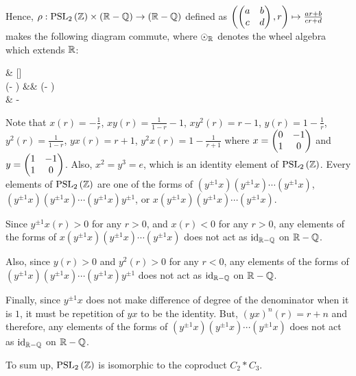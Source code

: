 {    Hence, $\rho : \mathrm{PSL}_{2}\left(\mathbb{Z}\right) \times \left(\mathbb{R} - \mathbb{Q}\right) \to \left(\mathbb{R} - \mathbb{Q}\right)$ defined as $\left( \begin{pmatrix}a & b \\ c & d\end{pmatrix}, r \right) \mapsto \frac{ar+b}{cr+d}$ makes the following diagram commute, where $\odot_{\mathbb{R}}$ denotes the wheel algebra which extends $\mathbb{R}$:
    \begin{cd}[row sep=4em]
        \& [\widthof{$\left(\RR - \QQ\right)$}]  \ar[dr, "m_G \times \id{\RR}"] \\
         \times \left(\RR - \QQ\right)  \&\&  \times \left(\RR - \QQ\right) \ar[dl, "\rho"] \\
        \& \RR - \QQ
    \end{cd}

    Note that $x(r) = -\frac{1}{r}$, $xy(r) = \frac{1}{1-r}-1$, $xy^2(r) = r-1$, $y(r) = 1-\frac{1}{r}$, $y^2(r) = \frac{1}{1-r}$, $yx(r) = r+1$, $y^2x(r) = 1-\frac{1}{r+1}$ where $x = \begin{pmatrix}0 & -1 \\ 1 & 0\end{pmatrix}$ and $y = \begin{pmatrix}1 & -1 \\ 1 & 0\end{pmatrix}$.
    Also, $x^2 = y^3 = e$, which is an identity element of $\mathrm{PSL}_{2}\left(\mathbb{Z}\right)$.
    Every elements of $\mathrm{PSL}_{2}\left(\mathbb{Z}\right)$ are one of the forms of $\left(y^{\pm1}x\right)\left(y^{\pm1}x\right)\cdots\left(y^{\pm1}x\right)$, $\left(y^{\pm1}x\right)\left(y^{\pm1}x\right)\cdots\left(y^{\pm1}x\right)y^{\pm1}$, or $x\left(y^{\pm1}x\right)\left(y^{\pm1}x\right)\cdots\left(y^{\pm1}x\right)$.

    Since $y^{\pm1}x(r) > 0$ for any $r > 0$, and $x(r) < 0$ for any $r > 0$, any elements of the forms of $x\left(y^{\pm1}x\right)\left(y^{\pm1}x\right)\cdots\left(y^{\pm1}x\right)$ does not act as $\mathrm{id}_{\mathbb{R}-\mathbb{Q}}$ on $\mathbb{R}-\mathbb{Q}$.
    
    Also, since $y(r) > 0$ and $y^2(r) > 0$ for any $r < 0$, any elements of the forms of $\left(y^{\pm1}x\right)\left(y^{\pm1}x\right)\cdots\left(y^{\pm1}x\right)y^{\pm1}$ does not act as $\mathrm{id}_{\mathbb{R}-\mathbb{Q}}$ on $\mathbb{R}-\mathbb{Q}$.

    Finally, since $y^{\pm1}x$ does not make difference of degree of the denominator when it is $1$, it must be repetition of $yx$ to be the identity.
    But, $(yx)^n(r) = r+n$ and therefore, any elements of the forms of $\left(y^{\pm1}x\right)\left(y^{\pm1}x\right)\cdots\left(y^{\pm1}x\right)$ does not act as $\mathrm{id}_{\mathbb{R}-\mathbb{Q}}$ on $\mathbb{R}-\mathbb{Q}$.

    To sum up, $\mathrm{PSL}_{2}\left(\mathbb{Z}\right)$ is isomorphic to the coproduct $C_2 * C_3$.
}

